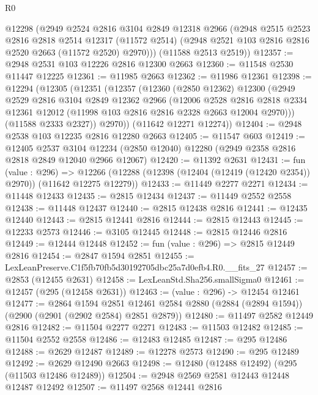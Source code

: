 \begin{lexlean}{R0}
\begin{coremodule}
      @12298
      (@2949
        @2524
        @2816
        @3104
        @2849
        @12318
        @2966
        (@2948
          @2515
          @2523
          @2816
          @2818
          @2514
          @12317
          (@11572 @2514)
          (@2948 @2521 @103 @2816 @2816 @2520 @2663 (@11572 @2520) @2970)))
      (@11588 @2513 @2519))
@12357 := @2948 @2531 @103 @12226 @2816 @12300 @2663
@12360 := @11548 @2530 @11447 @12225
@12361 := @11985 @2663
@12362 := @11986 @12361
@12398 := @12294
    (@12305
      (@12351
        (@12357
          (@12360
            (@2850 @12362)
            @12300
            (@2949
              @2529
              @2816
              @3104
              @2849
              @12362
              @2966
              (@12006
                @2528
                @2816
                @2818
                @2334
                @12361
                @12012
                (@11998 @103 @2816 @2816 @2328 @2663 @12004 @2970)))
            (@11588 @2333 @2327))
          @2970))
      (@11642 @12271 @12274))
@12404 := @2948 @2538 @103 @12235 @2816 @12280 @2663
@12405 := @11547 @603
@12419 := @12405
    @2537
    @3104
    @12234
    (@2850 @12040)
    @12280
    (@2949 @2358 @2816 @2818 @2849 @12040 @2966 @12067)
@12420 := @11392 @2631
@12431 := fun (value : @296) =>
  @12266 (@12288 (@12398 (@12404 (@12419 (@12420 @2354)) @2970)) (@11642 @12275 @12279))
@12433 := @11449 @2277 @2271
@12434 := @11448 @12433
@12435 := @2815 @12434
@12437 := @11449 @2552 @2558
@12438 := @11448 @12437
@12440 := @2815 @12438 @2816
@12441 := @12435 @12440
@12443 := @2815 @12441 @2816
@12444 := @2815 @12443
@12445 := @12233 @2573
@12446 := @3105 @12445
@12448 := @2815 @12446 @2816
@12449 := @12444 @12448
@12452 := fun (value : @296) => @2815 @12449 @2816
@12454 := @2847 @1594 @2851
@12455 := LexLeanPreserve.C1f5fb70fb5d30192705dbc25a7d0efb4.R0.__fits_27
@12457 := @2853 (@12455 @2631)
@12458 := LexLeanStd.Sha256.smallSigma0
@12461 := @12457 (@295 (@12458 @2631))
@12463 := (value : @296) -> @12454 @12461
@12477 := @2864
    @1594
    @2851
    @12461
    @2584
    @2880
    (@2884 (@2894 @1594))
    (@2900 (@2901 (@2902 @2584) @2851 @2879))
@12480 := @11497 @2582 @12449 @2816
@12482 := @11504 @2277 @2271
@12483 := @11503 @12482
@12485 := @11504 @2552 @2558
@12486 := @12483 @12485
@12487 := @295 @12486
@12488 := @2629 @12487
@12489 := @12278 @2573
@12490 := @295 @12489
@12492 := @2629 @12490 @2663
@12498 := @12480 (@12488 @12492) (@295 (@11503 @12486 @12489))
@12504 := @2948 @2569 @2581 @12443 @12448 @12487 @12492
@12507 := @11497 @2568 @12441 @2816

\end{coremodule}
\end{lexlean}
